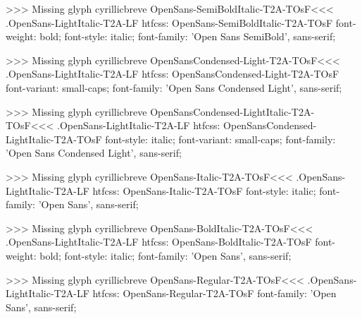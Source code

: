 >>>
Missing glyph	cyrillicbreve
\<OpenSans-SemiBoldItalic-T2A-TOsF\><<<
.OpenSans-LightItalic-T2A-LF
htfcss:  OpenSans-SemiBoldItalic-T2A-TOsF  font-weight: bold; font-style: italic; font-family: 'Open Sans SemiBold', sans-serif;

>>>
Missing glyph	cyrillicbreve
\<OpenSansCondensed-Light-T2A-TOsF\><<<
.OpenSans-LightItalic-T2A-LF
htfcss:  OpenSansCondensed-Light-T2A-TOsF  font-variant: small-caps; font-family: 'Open Sans Condensed Light', sans-serif;

>>>
Missing glyph	cyrillicbreve
\<OpenSansCondensed-LightItalic-T2A-TOsF\><<<
.OpenSans-LightItalic-T2A-LF
htfcss:  OpenSansCondensed-LightItalic-T2A-TOsF  font-style: italic; font-variant: small-caps; font-family: 'Open Sans Condensed Light', sans-serif;

>>>
Missing glyph	cyrillicbreve
\<OpenSans-Italic-T2A-TOsF\><<<
.OpenSans-LightItalic-T2A-LF
htfcss:  OpenSans-Italic-T2A-TOsF  font-style: italic; font-family: 'Open Sans', sans-serif;

>>>
Missing glyph	cyrillicbreve
\<OpenSans-BoldItalic-T2A-TOsF\><<<
.OpenSans-LightItalic-T2A-LF
htfcss:  OpenSans-BoldItalic-T2A-TOsF  font-weight: bold; font-style: italic; font-family: 'Open Sans', sans-serif;

>>>
Missing glyph	cyrillicbreve
\<OpenSans-Regular-T2A-TOsF\><<<
.OpenSans-LightItalic-T2A-LF
htfcss:  OpenSans-Regular-T2A-TOsF  font-family: 'Open Sans', sans-serif;

